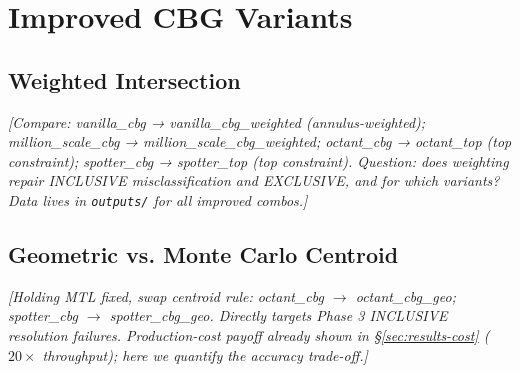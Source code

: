 \section{Improved CBG Variants}
\label{sec:improved}

%
%
%
%

\subsection{Weighted Intersection}
\label{sec:improved-weighted}
\textit{[Compare: vanilla\_cbg → vanilla\_cbg\_weighted (annulus-weighted);
million\_scale\_cbg → million\_scale\_cbg\_weighted; octant\_cbg → octant\_top (top constraint);
spotter\_cbg → spotter\_top (top constraint).
Question: does weighting repair INCLUSIVE misclassification and EXCLUSIVE, and for which variants?
Data lives in \texttt{outputs/} for all improved combos.]}

\subsection{Geometric vs. Monte Carlo Centroid}
\label{sec:improved-centroid}
\textit{[Holding MTL fixed, swap centroid rule: octant\_cbg $\to$ octant\_cbg\_geo;
spotter\_cbg $\to$ spotter\_cbg\_geo. Directly targets Phase 3 INCLUSIVE resolution failures.
Production-cost payoff already shown in §\ref{sec:results-cost} ($20\times$ throughput);
here we quantify the accuracy trade-off.]}

